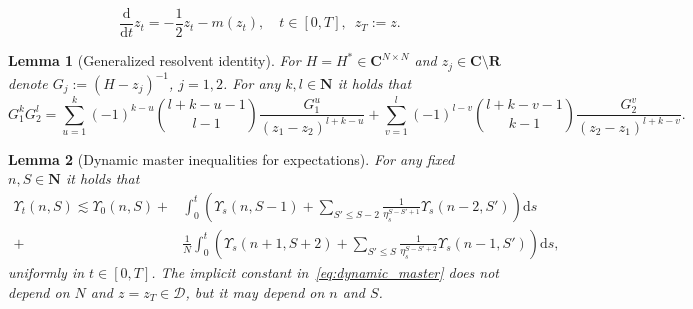 \documentclass[10pt,a4paper]{amsart}
\newtheorem{lemma}{Lemma}
\newcommand{\C}{\mathbf{C}}
\newcommand{\N}{\mathbf{N}}
\newcommand{\R}{\mathbf{R}}
\newcommand{\dif}{\mathrm{d}}
\begin{document}
\begin{equation}
\frac{\dif}{\dif t} z_t = -\frac{1}{2} z_t -m(z_t),\quad t\in[0,T],\,\, \,z_T:=z.
\label{eq:char_flow}
\end{equation}

\begin{lemma}[Generalized resolvent identity]\label{lem:resolvent_id} For $H=H^*\in\C^{N\times N}$ and $z_j\in\C\setminus\R$ denote $G_j:=(H-z_j)^{-1}$, $j=1,2$. For any $k,l\in\N$ it holds that
\begin{equation}
G_1^kG_2^l = \sum_{u=1}^k (-1)^{k-u} \binom{l+k-u-1}{l-1} \frac{G_1^u}{(z_1-z_2)^{l+k-u}} + \sum_{v=1}^l (-1)^{l-v} \binom{l+k-v-1}{k-1} \frac{G_2^v}{(z_2-z_1)^{l+k-v}}.
\label{eq:resolvent_id}
\end{equation}
\end{lemma}

\begin{lemma}[Dynamic master inequalities for expectations]\label{lem:dynamic_master} For any fixed $n,S\in\N$ it holds that
\begin{equation}
\begin{split}
\Upsilon_t(n,S)\lesssim \Upsilon_0(n,S) + &\int_0^t \left(\Upsilon_s(n,S-1) + \sum_{S'\le S-2} \frac{1}{\eta^{S-S'+1}_s}\Upsilon_s(n-2,S')\right)\dif s\\
+&\frac{1}{N}\int_0^t \left(\Upsilon_s(n+1,S+2) + \sum_{S'\le S}\frac{1}{\eta^{S-S'+2}_s}\Upsilon_s(n-1,S')\right)\dif s,
\end{split}
\label{eq:dynamic_master}
\end{equation}
uniformly in $t\in [0,T]$. The implicit constant in~\eqref{eq:dynamic_master} does not depend on $N$ and $z=z_T\in\mathcal{D}$, but it may depend on $n$ and $S$.
\end{lemma}
\end{document}
